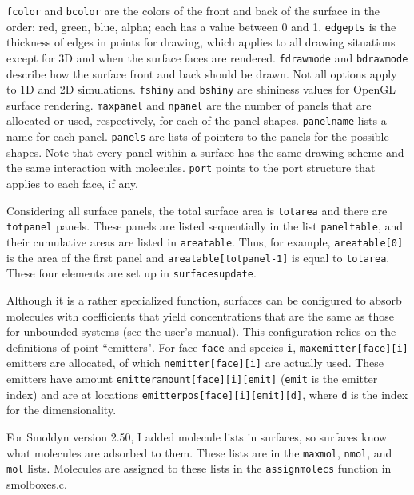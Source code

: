 \documentclass {book}
\begin{document}
\texttt{fcolor} and \texttt{bcolor} are the colors of the front and back of the surface in the order: red, green, blue, alpha; each has a value between 0 and 1. \texttt{edgepts} is the thickness of edges in points for drawing, which applies to all drawing situations except for 3D and when the surface faces are rendered. \texttt{fdrawmode} and \texttt{bdrawmode} describe how the surface front and back should be drawn. Not all options apply to 1D and 2D simulations. \texttt{fshiny} and \texttt{bshiny} are shininess values for OpenGL surface rendering. \texttt{maxpanel} and \texttt{npanel} are the number of panels that are allocated or used, respectively, for each of the panel shapes. \texttt{panelname} lists a name for each panel. \texttt{panels} are lists of pointers to the panels for the possible shapes. Note that every panel within a surface has the same drawing scheme and the same interaction with molecules. \texttt{port} points to the port structure that applies to each face, if any.

Considering all surface panels, the total surface area is \texttt{totarea} and there are \texttt{totpanel} panels. These panels are listed sequentially in the list \texttt{paneltable}, and their cumulative areas are listed in \texttt{areatable}. Thus, for example, \texttt{areatable[0]} is the area of the first panel and \texttt{areatable[totpanel-1]} is equal to \texttt{totarea}. These four elements are set up in \texttt{surfacesupdate}.

Although it is a rather specialized function, surfaces can be configured to absorb molecules with coefficients that yield concentrations that are the same as those for unbounded systems (see the user's manual). This configuration relies on the definitions of point ``emitters". For face \texttt{face} and species \texttt{i}, \texttt{maxemitter[face][i]} emitters are allocated, of which \texttt{nemitter[face][i]} are actually used. These emitters have amount \texttt{emitteramount[face][i][emit]} (\texttt{emit} is the emitter index) and are at locations \texttt{emitterpos[face][i][emit][d]}, where \texttt{d} is the index for the dimensionality.

For Smoldyn version 2.50, I added molecule lists in surfaces, so surfaces know what molecules are adsorbed to them. These lists are in the \texttt{maxmol}, \texttt{nmol}, and \texttt{mol} lists. Molecules are assigned to these lists in the \texttt{assignmolecs} function in smolboxes.c.
\end{document}
